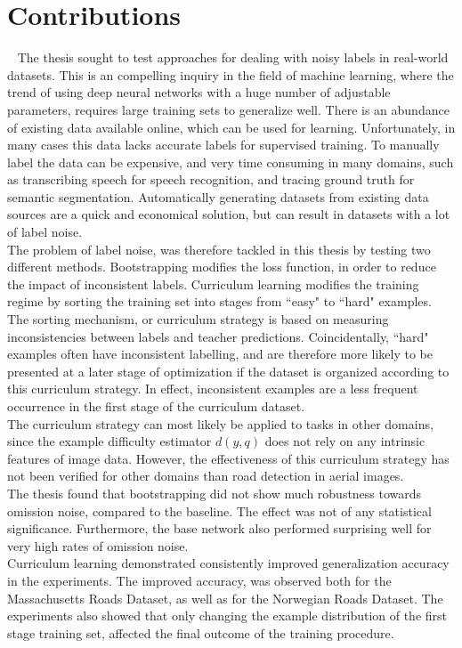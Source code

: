 \section{Contributions}~\label{cont}
\label{sec:Contributions}
The thesis sought to test approaches for dealing with noisy labels in real-world datasets. This is an compelling inquiry in the field of machine learning, where the trend of using deep neural networks with a huge number of adjustable parameters, requires large training sets to generalize well. There is an abundance of existing data available online, which can be used for learning. Unfortunately, in many cases this data lacks accurate labels for supervised training. To manually label the data can be expensive, and very time consuming in many domains, such as transcribing speech for speech recognition, and tracing ground truth for semantic segmentation. Automatically generating datasets from existing data sources are a quick and economical solution, but can result in datasets with a lot of label noise.\\

The problem of label noise, was therefore tackled in this thesis by testing two different methods. Bootstrapping modifies the loss function, in order to reduce the impact of inconsistent labels. Curriculum learning modifies the training regime by sorting the training set into stages from ``easy" to ``hard" examples. The sorting mechanism, or curriculum strategy is based on measuring inconsistencies between labels and teacher predictions. Coincidentally, ``hard" examples often have inconsistent labelling, and are therefore more likely to be presented at a later stage of optimization if the dataset is organized according to this curriculum strategy. In effect, inconsistent examples are a less frequent occurrence in the first stage of the curriculum dataset.\\
 
The curriculum strategy can most likely be applied to tasks in other domains, since the example difficulty estimator $d(y,q)$ does not rely on any intrinsic features of image data. However, the effectiveness of this curriculum strategy has not been verified for other domains than road detection in aerial images.\\

The thesis found that bootstrapping did not show much robustness towards omission noise, compared to the baseline. The effect was not of any statistical significance. Furthermore, the base network also performed surprising well for very high rates of omission noise. \\

Curriculum learning demonstrated consistently improved generalization accuracy in the experiments. The improved accuracy, was observed both for the Massachusetts Roads Dataset, as well as for the Norwegian Roads Dataset. The experiments also showed that only changing the example distribution of the first stage training set, affected the final outcome of the training procedure.\\

